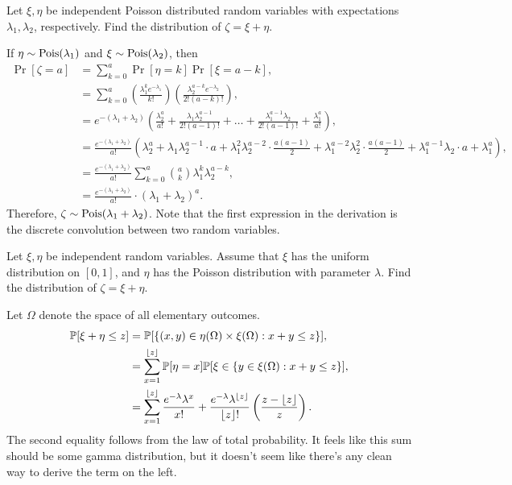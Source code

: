 \begin{problem}{10}
    Let $\xi,\eta$ be independent Poisson distributed random variables with expectations $\lambda_1,\lambda_2$, respectively. Find the distribution of $\zeta = \xi + \eta$. 
\end{problem}
\begin{solution}
    If $\eta \sim \operatorname{Pois}(\lambda_1)$ and $\xi \sim \operatorname{Pois}(\lambda_2)$, then 
    \begin{align*}
        \Pr[\zeta = a] &= \sum_{k=0}^a \Pr[\eta = k]\Pr[\xi = a - k], \\
        &= \sum_{k=0}^a \left(\frac{\lambda_1^k e^{-\lambda_1}}{k!}\right)\left(\frac{\lambda_2^{a-k}e^{-\lambda_2}}{2!(a-k)!}\right), \\
        &= e^{-(\lambda_1 + \lambda_2)}\left(\frac{\lambda_2^a}{a!} + \frac{\lambda_1\lambda_2^{a-1}}{2!(a-1)!} + \ldots + \frac{\lambda_1^{a-1}\lambda_2}{2!(a-1)!} + \frac{\lambda_1^a}{a!}\right), \\
        &= \frac{e^{-(\lambda_1 + \lambda_2)}}{a!}\left(\lambda_2^a + \lambda_1\lambda_2^{a-1}\cdot a + \lambda_1^2\lambda_2^{a-2} \cdot \frac{a(a-1)}{2} + \lambda_1^{a-2}\lambda_2^2 \cdot \frac{a(a-1)}{2} + \lambda_1^{a-1}\lambda_2 \cdot a + \lambda_1^a\right), \\
        &=  \frac{e^{-(\lambda_1 + \lambda_2)}}{a!} \sum_{k=0}^a \binom{a}{k} \lambda_1^k \lambda_2^{a-k}, \\
        &= \frac{e^{-(\lambda_1 + \lambda_2)}}{a!} \cdot (\lambda_1 + \lambda_2)^a.
    \end{align*}
    Therefore, $\zeta \sim \operatorname{Pois}(\lambda_1 + \lambda_2)$. Note that the first expression in the derivation is the discrete convolution between two random variables. 
\end{solution}

\begin{problem}{11}
    Let $\xi,\eta$ be independent random variables. Assume that $\xi$ has the uniform distribution on $[0,1]$, and $\eta$ has the Poisson distribution with parameter $\lambda$. Find the distribution of $\zeta = \xi + \eta$. 
\end{problem}
\begin{solution}
    Let $\Omega$ denote the space of all elementary outcomes. 
    \begin{align*}
        \mathbb{P}[\xi + \eta \leq z] &= \mathbb{P}[\{(x,y) \in \eta(\Omega) \times \xi(\Omega): x + y \leq z\}], \\
        &= \sum_{x=1}^{\lfloor z\rfloor} \mathbb{P}[\eta = x]\mathbb{P}[\xi \in \{y \in \xi(\Omega): x + y \leq z\}], \\
        &= \sum_{x=1}^{\lfloor z\rfloor} \frac{e^{-\lambda} \lambda^x}{x!} + \frac{e^{-\lambda}\lambda^{\lfloor z\rfloor}}{\lfloor z\rfloor!}\left(\frac{z - \lfloor z\rfloor}{z}\right).
    \end{align*}
    The second equality follows from the law of total probability. It feels like this sum should be some gamma distribution, but it doesn't seem like there's any clean way to derive the term on the left. 
\end{solution}


